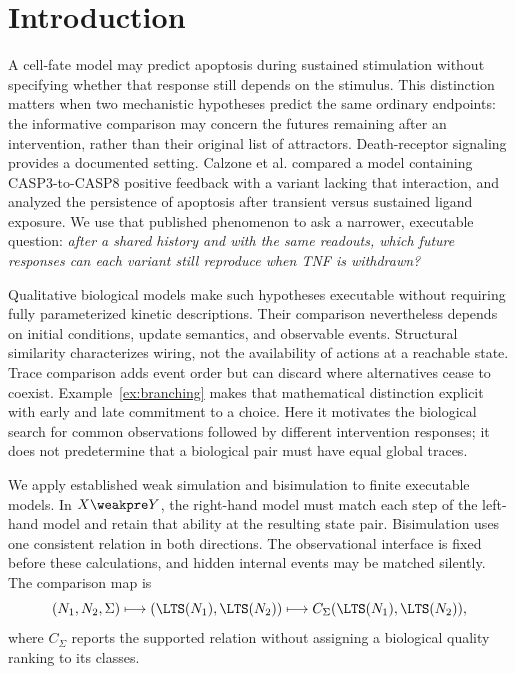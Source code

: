 \section{Introduction}\label{sec:introduction}

A cell-fate model may predict apoptosis during sustained stimulation without
specifying whether that response still depends on the stimulus. This distinction
matters when two mechanistic hypotheses predict the same ordinary endpoints:
the informative comparison may concern the futures remaining after an
intervention, rather than their original list of attractors. Death-receptor
signaling provides a documented setting. Calzone et al. compared a model
containing CASP3-to-CASP8 positive feedback with a variant lacking that
interaction, and analyzed the persistence of apoptosis after transient versus
sustained ligand exposure.\cite{Calzone2010} We use that published phenomenon
to ask a narrower, executable question: \emph{after a shared history and with
the same readouts, which future responses can each variant still reproduce
when TNF is withdrawn?}

Qualitative biological models make such hypotheses executable without requiring
fully parameterized kinetic descriptions.\cite{ChaouiyaPetriBio2007,Li2006,Fisher2007}
Their comparison nevertheless depends on initial conditions, update semantics,
and observable events. Structural similarity characterizes wiring, not the
availability of actions at a reachable state.\cite{Szawulak2022} Trace comparison
adds event order but can discard where alternatives cease to coexist.
Example~\ref{ex:branching} makes that mathematical distinction explicit with
early and late commitment to a choice. Here it motivates the biological
search for common observations followed by different intervention responses;
it does not predetermine that a biological pair must have equal global traces.

We apply established weak simulation and bisimulation\cite{Milner1989,Sangiorgi2011}
to finite executable models. In $X\weakpre Y$, the right-hand model must match
each step of the left-hand model and retain that ability at the resulting
state pair. Bisimulation uses one consistent relation in both directions.
The observational interface is fixed before these calculations, and hidden
internal events may be matched silently. The comparison map is
\begin{equation}\label{eq:comparison-map}
 (N_1,N_2,\Sigma)\longmapsto(\LTS(N_1),\LTS(N_2))
 \longmapsto C_\Sigma(\LTS(N_1),\LTS(N_2)),
\end{equation}
where $C_\Sigma$ reports the supported relation without assigning a biological
quality ranking to its classes.

